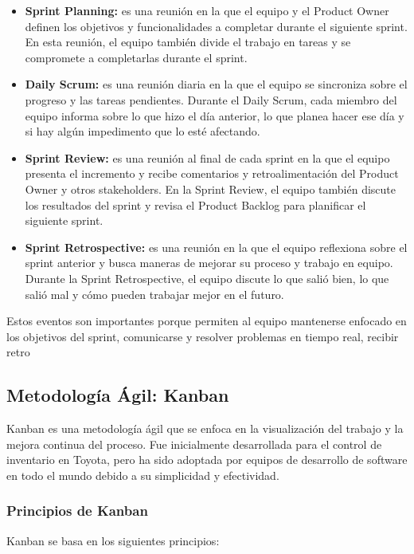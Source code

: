 \documentclass[executivepaper]{article}
\begin{document}
\begin{itemize}
\item \textbf{Sprint Planning:} es una reunión en la que el equipo y el Product Owner definen los objetivos y funcionalidades a completar durante el siguiente sprint. En esta reunión, el equipo también divide el trabajo en tareas y se compromete a completarlas durante el sprint.
\item \textbf{Daily Scrum:} es una reunión diaria en la que el equipo se sincroniza sobre el progreso y las tareas pendientes. Durante el Daily Scrum, cada miembro del equipo informa sobre lo que hizo el día anterior, lo que planea hacer ese día y si hay algún impedimento que lo esté afectando.
\item \textbf{Sprint Review:} es una reunión al final de cada sprint en la que el equipo presenta el incremento y recibe comentarios y retroalimentación del Product Owner y otros stakeholders. En la Sprint Review, el equipo también discute los resultados del sprint y revisa el Product Backlog para planificar el siguiente sprint.
\item \textbf{Sprint Retrospective:} es una reunión en la que el equipo reflexiona sobre el sprint anterior y busca maneras de mejorar su proceso y trabajo en equipo. Durante la Sprint Retrospective, el equipo discute lo que salió bien, lo que salió mal y cómo pueden trabajar mejor en el futuro.
\end{itemize}

Estos eventos son importantes porque permiten al equipo mantenerse enfocado en los objetivos del sprint, comunicarse y resolver problemas en tiempo real, recibir retro

\newpage
\subsection{Metodología Ágil: Kanban}

Kanban es una metodología ágil que se enfoca en la visualización del trabajo y la mejora continua del proceso. Fue inicialmente desarrollada para el control de inventario en Toyota, pero ha sido adoptada por equipos de desarrollo de software en todo el mundo debido a su simplicidad y efectividad.

\subsubsection*{Principios de Kanban}

Kanban se basa en los siguientes principios:
\end{document}
